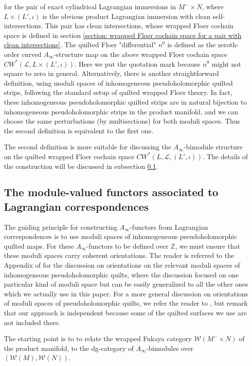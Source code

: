 \documentclass{amsart}
\numberwithin{equation}{section}
\numberwithin{figure}{section}
\begin{document}
for the pair of exact cylindrical Lagrangian immersions in $M^{-} \times N$, where $L \times (L', \iota)$ is the obvious product Lagrangian immersion with clean self-intersections. This pair has clean intersections, whose wrapped Floer cochain space is defined in section \ref{section: wrapped Floer cochain space for a pair with clean intersections}. The quilted Floer "differential" $n^{0}$ is defined as the zeroth-order curved $A_{\infty}$-structure map on the above wrapped Floer cochain space $CW^{*}(\mathcal{L}, L \times (L', \iota))$. Here we put the quotation mark because $n^{0}$ might not square to zero in general. Alternatively, there is another straightforward definition, using moduli spaces of inhomogeneous pseudoholomorphic quilted strips, following the standard setup of quilted wrapped Floer theory. In fact, these inhomogeneous pseudoholomorphic quilted strips are in natural bijection to inhomogeneous pseudoholomorphic strips in the product manifold, and we can choose the same perturbations (by multisections) for both moduli spaces. Thus the second definition is equivalent to the first one. \par
	The second definition is more suitable for discussing the $A_{\infty}$-bimodule structure on the quilted wrapped Floer cochain space $CW^{*}(L, \mathcal{L}, (L', \iota))$. The details of the construction will be discussed in subsection \ref{section: module-valued functors}. \par

\subsection{The module-valued functors associated to Lagrangian correspondences}\label{section: module-valued functors}
	The guiding principle for constructing $A_{\infty}$-functors from Lagrangian correspondences is to use moduli spaces of inhomogeneous pseudoholomorphic quilted maps. For these $A_{\infty}$-functors to be defined over $\mathbb{Z}$, we must ensure that these moduli spaces carry coherent orientations. The reader is referred to the Appendix of \cite{Gao1} for the discussion on orientations on the relevant moduli spaces of inhomogeneous pseudoholomorphic quilts, where the discussion focused on one particular kind of moduli space but can be easily generalized to all the other ones which we actually use in this paper. For a more general discussion on orientations of moduli spaces of pseudoholomorphic quilts, we refer the reader to \cite{Wehrheim-Woodward5}, but remark that our approach is independent because some of the quilted surfaces we use are not included there. \par
	The starting point is to to relate the wrapped Fukaya category $\mathcal{W}(M^{-} \times N)$ of the product manifold, to the dg-category of $A_{\infty}$-bimodules over $(\mathcal{W}(M), \mathcal{W}(N))$. \par
\end{document}
